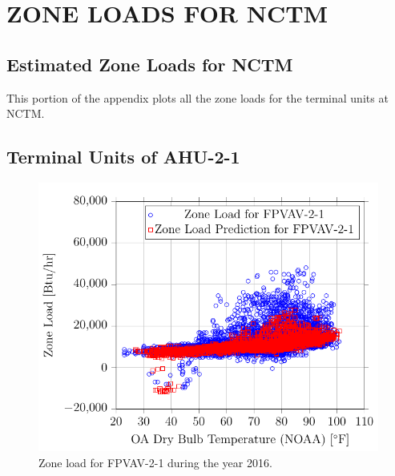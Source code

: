 %
%
%


\chapter{\texorpdfstring{\MakeUppercase{ZONE LOADS FOR NCTM}}{Zone Loads for NCTM}}

\section{Estimated Zone Loads for NCTM}

This portion of the appendix plots all the zone loads for the terminal
units at NCTM. 

\newcommand{\zoneLoadAppendixPlotsCaption}[1]{Zone load for #1 during the year 2016.}

\section{Terminal Units of AHU-2-1}
\begin{figure}
    \centering
    \includegraphics{Plots/04/2017-06-27-0830-BtuhrvsOADryBulbTemperatureNOAAF.pdf}
    \caption{\zoneLoadAppendixPlotsCaption{FPVAV-2-1}}
    \label{fig:2017-06-27-0830-BtuhrvsOADryBulbTemperatureNOAAF}
\end{figure}

